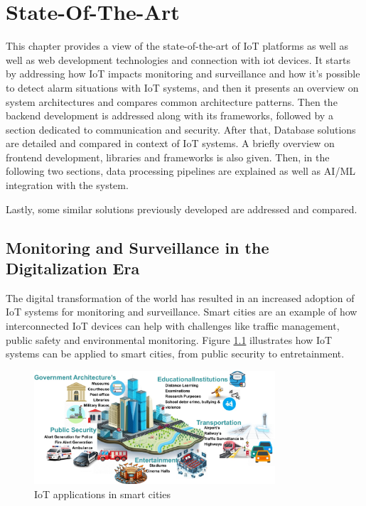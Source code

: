 
%

\chapter{State-Of-The-Art}
\label{cha:State-Of-The-Art}

This chapter provides a view of the state-of-the-art of \gls{IoT} platforms as well
as well as web development technologies and connection with iot devices.
It starts by addressing how \gls{IoT} impacts monitoring and surveillance and how it's
possible to detect alarm situations with \gls{IoT} systems, and then it presents an overview on system architectures and compares common
architecture patterns. Then the backend development is addressed along with
its frameworks, followed by a section dedicated to communication and security.
After that, Database solutions are detailed and compared in context of IoT
systems. A briefly overview on frontend development, libraries and frameworks is
also given.
Then, in the following two sections, data processing pipelines are explained as
well as \gls{AI}/\gls{ML} integration with the system.

Lastly, some similar solutions previously developed are addressed and compared.

\section{Monitoring and Surveillance in the Digitalization Era}
The digital transformation of the world has resulted in an increased adoption
of \gls{IoT} systems for monitoring and surveillance. Smart cities are an
example of how interconnected \gls{IoT} devices can help with challenges
like traffic management, public safety and environmental monitoring\cite{sharma2024}. Figure
\ref{fig:monitoring:smartcities}
illustrates how \gls{IoT} systems can be applied to smart cities, from public
security to entretainment.

\begin{figure}[H]
	\centering
	\includegraphics[width=0.8\textwidth, height=0.5\textheight, keepaspectratio]{Chapters/Figures/Monitoring/SmartCities.png}
	\caption{IoT applications in smart cities\cite{sharma2024}}
	\label{fig:monitoring:smartcities}
\end{figure}

